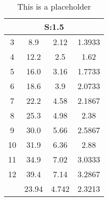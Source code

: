 
\begin{table}[H]
	\centering
\begin{tabular}{c|ccc}
\multicolumn{4}{c}{S:1.5}\\\hline
3 & 8.9 & 2.12 & 1.3933\\
4 & 12.2 & 2.5 & 1.62\\
5 & 16.0 & 3.16 & 1.7733\\
6 & 18.6 & 3.9 & 2.0733\\
7 & 22.2 & 4.58 & 2.1867\\
8 & 25.3 & 4.98 & 2.38\\
9 & 30.0 & 5.66 & 2.5867\\
10 & 31.9 & 6.36 & 2.88\\
11 & 34.9 & 7.02 & 3.0333\\
12 & 39.4 & 7.14 & 3.2867\\
\hline
& 23.94 & 4.742 & 2.3213\\
\end{tabular}
\caption{This is a placeholder}
\label{tab:s15}
\end{table}